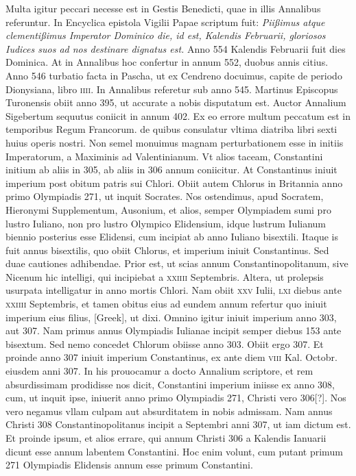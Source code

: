 Multa igitur peccari necesse est
in Gestis Benedicti, quae in illis Annalibus referuntur.
In Encyclica
epistola Vigilii Papae scriptum fuit: \textit{Piißimus atque clementißimus
Imperator Dominico die, id est, Kalendis Februarii, gloriosos Iudices suos
ad nos destinare dignatus est.}
Anno 554 Kalendis Februarii fuit dies
Dominica.
At in Annalibus hoc confertur in annum 552, duobus
annis citius.
Anno 546 turbatio facta in Pascha, ut ex Cendreno docuimus,
capite de periodo Dionysiana, libro \textsc{iiii}.
In Annalibus referetur
sub anno 545.
Martinus Episcopus Turonensis obiit anno
395, ut accurate a nobis disputatum est.
Auctor Annalium Sigebertum
sequutus coniicit in annum 402.
Ex eo errore multum peccatum
est in temporibus Regum Francorum.
de quibus consulatur vltima
diatriba libri sexti huius operis nostri.
Non semel monuimus magnam
perturbationem esse in initiis Imperatorum, a Maximinis
ad Valentinianum.
Vt alios taceam, Constantini initium ab aliis in
305, ab aliis in 306 annum coniicitur.
At Constantinus iniuit imperium
post obitum patris sui Chlori.
Obiit autem Chlorus in Britannia
anno primo Olympiadis 271, ut inquit Socrates.
Nos ostendimus,
apud Socratem, Hieronymi Supplementum, Ausonium, et alios,
semper Olympiadem sumi pro lustro Iuliano, non pro lustro Olympico
Elidensium, idque lustrum Iulianum biennio posterius esse Elidensi,
cum incipiat ab anno Iuliano bisextili.
Itaque is fuit annus bisextilis,
quo obiit Chlorus, et imperium iniuit Constantinus.
Sed duae
cautiones adhibendae.
Prior est, ut scias annum Constantinopolitanum,
sive Nicenum hic intelligi, qui incipiebat a \textsc{xxiiii} Septembris.
Altera, ut prolepsis usurpata intelligatur in anno mortis Chlori.
Nam obiit \textsc{xxv} Iulii, \textsc{lxi} diebus ante
\textsc{xxiiii} Septembris, et
tamen obitus eius ad eundem annum refertur quo iniuit imperium
eius filius, \textgreek{[Greek]}, ut dixi.
Omnino igitur iniuit imperium anno
303, aut 307.
Nam primus annus Olympiadis Iulianae incipit semper
diebus 153 ante bisextum.
Sed nemo concedet Chlorum obiisse
anno 303.
Obiit ergo 307.
Et proinde anno 307 iniuit imperium
Constantinus, ex ante diem \textsc{viii} Kal. Octobr. eiusdem anni 307.
In his prouocamur a docto Annalium scriptore, et rem absurdissimam
prodidisse nos dicit, Constantini imperium iniisse ex anno
308, cum, ut inquit ipse, iniuerit anno primo Olympiadis 271,
Christi vero 306[?].
Nos vero negamus vllam culpam aut absurditatem
in nobis admissam.
Nam annus Christi 308 Constantinopolitanus
incipit a Septembri anni 307, ut iam dictum est.
Et proinde ipsum, et alios errare, qui annum Christi 306 a
 Kalendis Ianuarii
dicunt esse annum labentem Constantini.
{}
Hoc enim volunt,
cum putant primum 271 Olympiadis Elidensis annum esse primum
Constantini.

